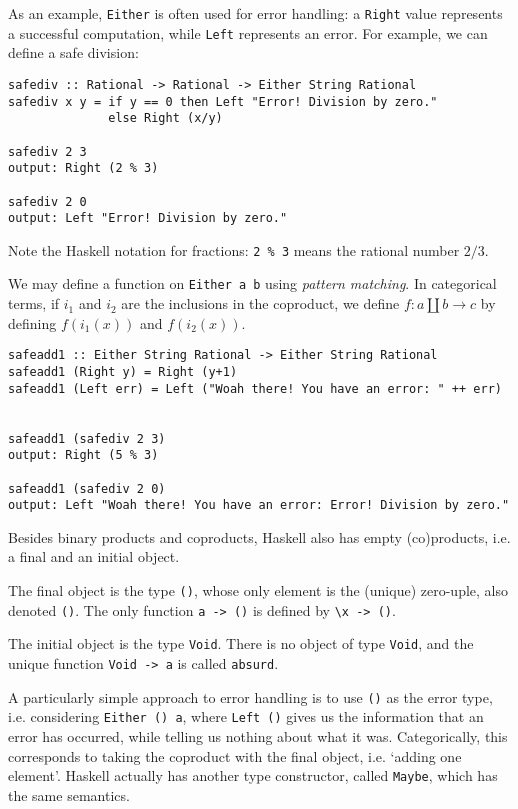 \documentclass[11pt]{article}
\theoremstyle{nonumberplain}
\newcommand*\lsin{\lstinline}
\begin{document}
As an example, \lsin|Either| is often used for error handling: a \lsin|Right| value represents a successful computation, while \lsin|Left| represents an error. For example, we can define a safe division:
\begin{lstlisting}
safediv :: Rational -> Rational -> Either String Rational
safediv x y = if y == 0 then Left "Error! Division by zero."
              else Right (x/y)
              
safediv 2 3
output: Right (2 % 3)

safediv 2 0
output: Left "Error! Division by zero."
\end{lstlisting}

Note the Haskell notation for fractions: \lsin|2 %

We may define a function on \lsin|Either a b| using \emph{pattern matching}. In categorical terms, if $i_1$ and $i_2$ are the inclusions in the coproduct, we define $f \colon a \amalg b \to c$ by defining $f(i_1(x))$ and $f(i_2(x))$.

\begin{lstlisting}
safeadd1 :: Either String Rational -> Either String Rational
safeadd1 (Right y) = Right (y+1)
safeadd1 (Left err) = Left ("Woah there! You have an error: " ++ err)


safeadd1 (safediv 2 3)
output: Right (5 % 3)

safeadd1 (safediv 2 0)
output: Left "Woah there! You have an error: Error! Division by zero."
\end{lstlisting}

Besides binary products and coproducts, Haskell also has empty (co)products, i.e. a final and an initial object.

The final object is the type \lsin|()|, whose only element is the (unique) zero-uple, also denoted \lsin|()|. The only function \lsin|a -> ()| is defined by \lsin|\x -> ()|.

The initial object is the type \lsin|Void|. There is no object of type \lsin|Void|, and the unique function \lsin|Void -> a| is called \lsin|absurd|.

A particularly simple approach to error handling is to use \lsin|()| as the error type, i.e. considering \lsin|Either () a|, where \lsin|Left ()| gives us the information that an error has occurred, while telling us nothing about what it was. Categorically, this corresponds to taking the coproduct with the final object, i.e. `adding one element'. Haskell actually has another type constructor, called \lsin|Maybe|, which has the same semantics.
\end{document}
